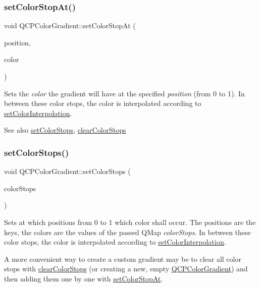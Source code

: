 \subsubsection{\texorpdfstring{set\+Color\+Stop\+At()}{setColorStopAt()}}
{\footnotesize\ttfamily void Q\+C\+P\+Color\+Gradient\+::set\+Color\+Stop\+At (\begin{DoxyParamCaption}\item[{double}]{position,  }\item[{const Q\+Color \&}]{color }\end{DoxyParamCaption})}

Sets the {\itshape color} the gradient will have at the specified {\itshape position} (from 0 to 1). In between these color stops, the color is interpolated according to \hyperlink{class_q_c_p_color_gradient_aa13fda86406e1d896a465a409ae63b38}{set\+Color\+Interpolation}.

\begin{DoxySeeAlso}{See also}
\hyperlink{class_q_c_p_color_gradient_a724e828aa6f0ba5011a9392477c35d3a}{set\+Color\+Stops}, \hyperlink{class_q_c_p_color_gradient_a939213e85f0d1279519d555c5fcfb6ad}{clear\+Color\+Stops} 
\end{DoxySeeAlso}
\mbox{\label{class_q_c_p_color_gradient_a724e828aa6f0ba5011a9392477c35d3a}} 
\subsubsection{\texorpdfstring{set\+Color\+Stops()}{setColorStops()}}
{\footnotesize\ttfamily void Q\+C\+P\+Color\+Gradient\+::set\+Color\+Stops (\begin{DoxyParamCaption}\item[{const Q\+Map$<$ double, Q\+Color $>$ \&}]{color\+Stops }\end{DoxyParamCaption})}

Sets at which positions from 0 to 1 which color shall occur. The positions are the keys, the colors are the values of the passed Q\+Map {\itshape color\+Stops}. In between these color stops, the color is interpolated according to \hyperlink{class_q_c_p_color_gradient_aa13fda86406e1d896a465a409ae63b38}{set\+Color\+Interpolation}.

A more convenient way to create a custom gradient may be to clear all color stops with \hyperlink{class_q_c_p_color_gradient_a939213e85f0d1279519d555c5fcfb6ad}{clear\+Color\+Stops} (or creating a new, empty \hyperlink{class_q_c_p_color_gradient}{Q\+C\+P\+Color\+Gradient}) and then adding them one by one with \hyperlink{class_q_c_p_color_gradient_a3b48be5e78079db1bb2a1188a4c3390e}{set\+Color\+Stop\+At}.

